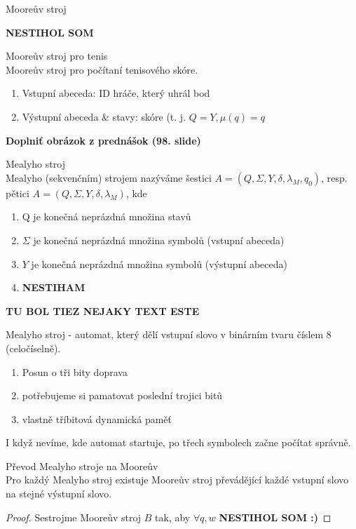 \documentclass[../main.tex]{subfiles}
\begin{document}
\begin{definition}
    Mooreův stroj
    
    \textbf{NESTIHOL SOM}
\end{definition}
\begin{example}
    Mooreův stroj pro tenis\\

    Mooreův stroj pro počítaní tenisového skóre.
    \begin{enumerate}
        \item Vstupní abeceda: ID hráče, který uhrál bod
        \item Výstupní abeceda $\&$ stavy: skóre (t. j. $Q = Y, \mu(q) = q$
    \end{enumerate}
    \textbf{Doplniť obrázok z prednášok (98. slide)}
\end{example}

\begin{definition}
    Mealyho stroj\\

    Mealyho (sekvenčním) strojem nazýváme šestici $A = (Q,\Sigma, Y, \delta, \lambda_M, q_0 )$, resp.
    pětici $A = (Q,\Sigma, Y, \delta, \lambda_M)$, kde
    \begin{enumerate}
        \item Q je konečná neprázdná množina stavů
        \item $\Sigma$ je konečná neprázdná množina symbolů (vstupní abeceda)
        \item $Y$ je konečná neprázdná množina symbolů (výstupní abeceda)
        \item \textbf{NESTIHAM}
    \end{enumerate}
    \textbf{TU BOL TIEZ NEJAKY TEXT ESTE}
\end{definition}
\begin{example}
    Mealyho stroj - automat, který dělí vstupní slovo v binárním tvaru číslem 8 (celočíselně).
    \begin{enumerate}
        \item Posun o tři bity doprava
        \item potřebujeme si pamatovat poslední trojici bitů
        \item vlastně tříbitová dynamická paměť
    \end{enumerate}
    I když nevíme, kde automat startuje, po třech symbolech začne počítat správně.
\end{example}

\begin{theorem}
    Převod Mealyho stroje na Mooreův\\

    Pro každý Mealyho stroj existuje Mooreův stroj převádějící každé vstupní slovo na stejné výstupní slovo.
   
    \begin{proof}
        Sestrojme Mooreův stroj $B$ tak, aby $\forall q,w$ \textbf{NESTIHOL SOM :)}
    \end{proof}
\end{theorem}
\end{document}
